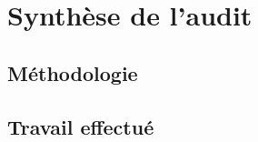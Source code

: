 \section{Synthèse de l'audit}
\label{sec:synthese_audit}

\subsection{Méthodologie}
\subsection{Travail effectué}